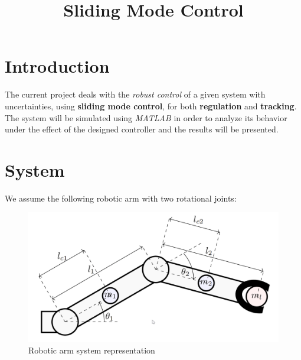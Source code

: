 \documentclass[a4paper]{article}
\title{Sliding Mode Control}
\begin{document}
\maketitle
% 

\section{Introduction}
The current project deals with the \textit{robust control} of a given system with uncertainties, using \textbf{sliding mode control}, 
for both \textbf{regulation} and \textbf{tracking}. The system will be simulated using \textit{MATLAB} in order 
to analyze its behavior under the effect of the designed controller and the results will be presented.

\section{System}
We assume the following robotic arm with two rotational joints:
\begin{figure}[H]
    \centering
    \includegraphics[width=14cm]{fig/fig1.png}
    \caption{Robotic arm system representation}
\end{figure}
\end{document}
